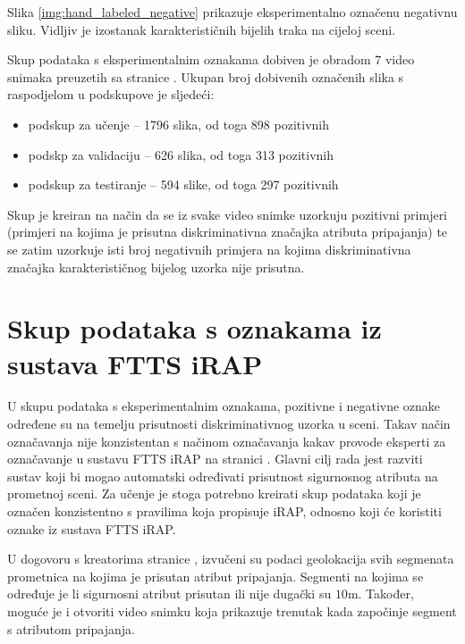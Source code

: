 \documentclass[times, utf8, diplomski, numeric]{fer}
\begin{document}
\noindent Slika \ref{img:hand_labeled_negative} prikazuje eksperimentalno označenu negativnu sliku.
Vidljiv je izostanak karakterističnih bijelih traka na cijeloj sceni.

Skup podataka s eksperimentalnim oznakama dobiven je obradom 7 video snimaka preuzetih sa stranice \citep{url:ftts_irap}. 
Ukupan broj dobivenih označenih slika s raspodjelom u podskupove je sljedeći:
\begin{itemize}
 \item podskup za učenje -- 1796 slika, od toga 898 pozitivnih
 \item podskp za validaciju -- 626 slika, od toga 313 pozitivnih
 \item podskup za testiranje -- 594 slike, od toga 297 pozitivnih
\end{itemize}

\noindent Skup je kreiran na način da se iz svake video snimke uzorkuju pozitivni primjeri (primjeri na kojima je prisutna diskriminativna značajka atributa pripajanja) te se zatim uzorkuje isti broj negativnih primjera na kojima diskriminativna značajka karakterističnog bijelog uzorka nije prisutna.

\section{Skup podataka s oznakama iz sustava FTTS iRAP}
U skupu podataka s eksperimentalnim oznakama, pozitivne i negativne oznake određene su na temelju prisutnosti diskriminativnog uzorka u sceni. 
Takav način označavanja nije konzistentan s načinom označavanja kakav provode eksperti za označavanje u sustavu FTTS iRAP na stranici \citep{url:ftts_irap}.
Glavni cilj rada jest razviti sustav koji bi mogao automatski određivati prisutnost sigurnosnog atributa na prometnoj sceni. 
Za učenje je stoga potrebno kreirati skup podataka koji je označen konzistentno s pravilima koja propisuje iRAP, odnosno koji će koristiti oznake iz sustava FTTS iRAP.

U dogovoru s kreatorima stranice \citep{url:ftts_irap}, izvučeni su podaci geolokacija svih segmenata prometnica na kojima je prisutan atribut pripajanja. 
Segmenti na kojima se određuje je li sigurnosni atribut prisutan ili nije dugački su $10$m.
Također, moguće je i otvoriti video snimku koja prikazuje trenutak kada započinje segment s atributom pripajanja.
\end{document}
